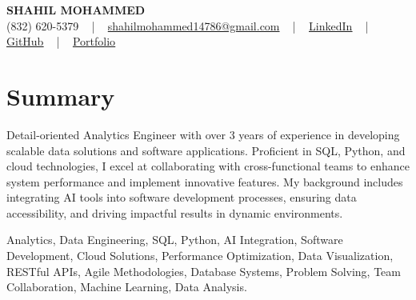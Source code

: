 \documentclass[letterpaper,10pt]{article}
\begin{document}
\begin{center}
    {\fontsize{14pt}{12pt}\selectfont \textbf{\MakeUppercase{Shahil Mohammed}}}\\ \vspace{2pt}
    \fontsize{10pt}{12pt}\selectfont (832) 620-5379 ~ | ~ \href{mailto:shahilmohammed14786@gmail.com}{shahilmohammed14786@gmail.com} ~ | ~  
    \href{https://www.linkedin.com/in/shahil-mohammed-9652931a1/}{\color{blue}\underline{LinkedIn}}  ~ | ~ 
    \href{https://github.com/freakbeast14}{\color{blue}\underline{GitHub}} ~ | ~ 
    \href{https://shahil-mohammed.netlify.app/}{\color{blue}\underline{Portfolio}}
    \vspace{-8pt}
\end{center}

\section{Summary}
\vspace{-2pt}\fontsize{8pt}{9pt}\selectfont
Detail-oriented Analytics Engineer with over 3 years of experience in developing scalable data solutions and software applications. Proficient in SQL, Python, and cloud technologies, I excel at collaborating with cross-functional teams to enhance system performance and implement innovative features. My background includes integrating AI tools into software development processes, ensuring data accessibility, and driving impactful results in dynamic environments. 

{\fontsize{1pt}{1pt}\selectfont\color{white}
Analytics, Data Engineering, SQL, Python, AI Integration, Software Development, Cloud Solutions, Performance Optimization, Data Visualization, RESTful APIs, Agile Methodologies, Database Systems, Problem Solving, Team Collaboration, Machine Learning, Data Analysis.
}
\vspace{-8pt}

\vspace{-2pt}
\end{document}
